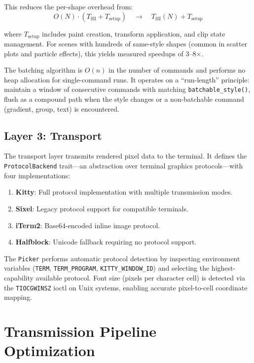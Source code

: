 \documentclass[11pt, a4paper, twocolumn]{article}
\begin{document}
This reduces the per-shape overhead from:
\[
    O(N) \cdot (T_{\text{fill}} + T_{\text{setup}}) \quad \to \quad T_{\text{fill}}(N) + T_{\text{setup}}
\]

where $T_{\text{setup}}$ includes paint creation, transform application, and clip state management.
For scenes with hundreds of same-style shapes (common in scatter plots and particle effects), this yields measured speedups of 3--8$\times$.

The batching algorithm is $O(n)$ in the number of commands and performs no heap allocation for single-command runs.
It operates on a ``run-length'' principle: maintain a window of consecutive commands with matching \texttt{batchable\_style()}, flush as a compound path when the style changes or a non-batchable command (gradient, group, text) is encountered.

\subsection{Layer 3: Transport}

The transport layer transmits rendered pixel data to the terminal.
It defines the \texttt{ProtocolBackend} trait---an abstraction over terminal graphics protocols---with four implementations:

\begin{enumerate}[leftmargin=1.5em, itemsep=0.1em]
    \item \textbf{Kitty}: Full protocol implementation with multiple transmission modes.
    \item \textbf{Sixel}: Legacy protocol support for compatible terminals.
    \item \textbf{iTerm2}: Base64-encoded inline image protocol.
    \item \textbf{Halfblock}: Unicode fallback requiring no protocol support.
\end{enumerate}

The \texttt{Picker} performs automatic protocol detection by inspecting environment variables (\texttt{TERM}, \texttt{TERM\_PROGRAM}, \texttt{KITTY\_WINDOW\_ID}) and selecting the highest-capability available protocol.
Font size (pixels per character cell) is detected via the \texttt{TIOCGWINSZ} ioctl on Unix systems, enabling accurate pixel-to-cell coordinate mapping.

\section{Transmission Pipeline Optimization}
\label{sec:transmission}
\end{document}
